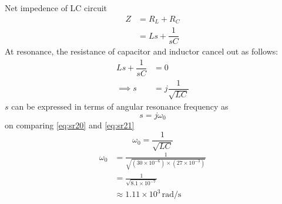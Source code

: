 \documentclass[journal,12pt,twocolumn]{IEEEtran}
\theoremstyle{remark}
\begin{document}
Net impedence of LC circuit \\
\begin{align}
Z&=R_L +R_C \\
&=Ls + \dfrac{1}{sC} 
\end{align}
At resonance, the resistance of capacitor and inductor cancel out as follows:
\begin{align}
    Ls + \dfrac{1}{sC} &= 0\\
    \implies s &= j\dfrac{1}{\sqrt{LC}} \label{eq:sr20}
\end{align}
$s$ can be expressed in terms of angular resonance frequency as
\begin{equation}
    s = j\omega_0 \label{eq:sr21}
\end{equation}
on comparing \eqref{eq:sr20} and \eqref{eq:sr21}
\begin{equation}
    \omega_0 = \dfrac{1}{\sqrt{LC}}
\end{equation}
\begin{align}
\omega_0 &= \frac{1}{\sqrt{(30 \times 10^{-6}) \times (27 \times 10^{-3})}} \\
&= \frac{1}{\sqrt{8.1 \times 10^{-7}}}\\
& \approx 1.11 \times 10^{3} \, \text{rad/s}
\end{align}
\end{document}
